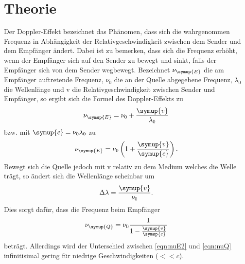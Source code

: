 \section{Theorie}
\label{sec:Theorie}

Der Doppler-Effekt bezeichnet das Phänomen, dass sich die wahrgenommen
Frequenz in Abhängigkeit der Relativgeschwindigkeit zwischen dem Sender und dem
Empfänger ändert. Dabei ist zu bemerken, dass sich die Frequenz erhöht, wenn der
Empfänger sich auf den Sender zu bewegt und sinkt, falls der Empfänger sich
von dem Sender wegbewegt.
Bezeichnet $\nu_{\symup{E}}$ die am Empfänger auftretende Frequenz, $\nu_0$ die
an der Quelle abgegebene Frequenz, $\lambda_0$ die Wellenlänge und v die
Relativgeschwindigkeit zwischen Sender und Empfänger, so ergibt sich die
Formel des Doppler-Effekts zu
\begin{equation}
  \nu_{\symup{E}} = \nu_0 + \frac{\symup{v}}{\lambda_0}
  \label{eqn:nuE1}
\end{equation}
bzw. mit $\symup{c} = \nu_0 \lambda_0$ zu
\begin{equation}
  \nu_{\symup{E}} = \nu_0 \left(1+ \frac{\symup{v}}{\symup{c}}\right).
  \label{eqn:nuE2}
\end{equation}
Bewegt sich die Quelle jedoch mit v relativ zu dem Medium welches die Welle
trägt, so ändert sich die Wellenlänge scheinbar um
\begin{equation*}
  \Delta \lambda = \frac{\symup{v}}{\nu_0}.
\end{equation*}
Dies sorgt dafür, dass die Frequenz beim Empfänger
\begin{equation}
  \nu_{\symup{Q}} = \nu_0 \frac{1}{1-\frac{\symup{v}}{\symup{c}}}
  \label{eqn:nuQ}
\end{equation}
beträgt. Allerdings wird der Unterschied zwischen \eqref{eqn:nuE2} und
\eqref{eqn:nuQ} infinitisimal gering für niedrige Geschwindigkeiten ($<< c$).
